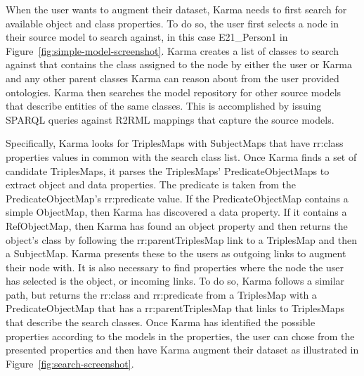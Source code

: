 When the user wants to augment their dataset, Karma needs to first search for available object and class properties.  
To do so, the user first selects a node in their source model to search against, in this case E21\_Person1 in Figure~\ref{fig:simple-model-screenshot}.
Karma creates a list of classes to search against that contains the class assigned to the node by either the user or Karma and any other parent classes Karma can reason about from the user provided ontologies.  
Karma then searches the model repository for other source models that describe entities of the same classes.  This is accomplished by issuing SPARQL queries against R2RML mappings that capture the source models.  

Specifically, Karma looks for TriplesMaps with SubjectMaps that have rr:class properties values in common with the search class list.  
Once Karma finds a set of candidate TriplesMaps, it parses the TriplesMaps' PredicateObjectMaps to extract object and data properties.  
The predicate is taken from the PredicateObjectMap's rr:predicate value.  
If the PredicateObjectMap contains a simple ObjectMap, then Karma has discovered a data property.  
If it contains a RefObjectMap, then Karma has found an object property and then returns the object's class by following the rr:parentTriplesMap link to a TriplesMap and then a SubjectMap.  
Karma presents these to the users as outgoing links to augment their node with.  
It is also necessary to find properties where the node the user has selected is the object, or incoming links.  
To do so, Karma follows a similar path, but returns the rr:class and rr:predicate from a TriplesMap with a PredicateObjectMap that has a rr:parentTriplesMap that links to TriplesMaps that describe the search classes. 
Once Karma has identified the possible properties according to the models in the properties, the user can chose from the presented properties and then have Karma augment their dataset as illustrated in Figure~\ref{fig:search-screenshot}.

